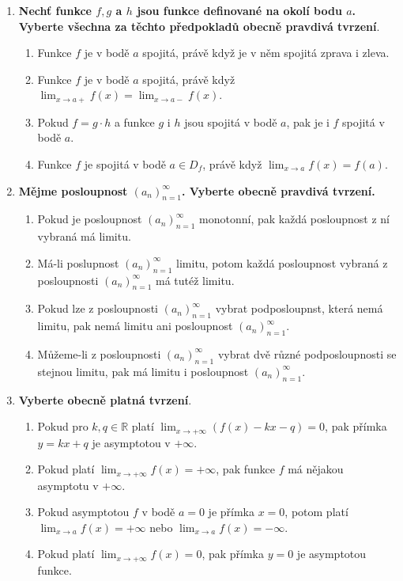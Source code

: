 \documentclass{article}
\begin{document}
\begin{enumerate}
    \pagebreak

    \item \textbf{Nechť funkce $f,g$ a $h$ jsou funkce definované na okolí bodu $a$. Vyberte všechna za těchto předpokladů obecně pravdivá tvrzení}. 
    \begin{enumerate}
        \item Funkce $f$ je v bodě $a$ spojitá, právě když je v něm spojitá zprava i zleva.
        \item Funkce $f$ je v bodě $a$ spojitá, právě když $\lim_{x \to a+}f(x) = \lim_{x \to a-}f(x)$.
        \item Pokud $f = g \cdot h$ a funkce $g$ i $h$ jsou spojitá v bodě $a$, pak je i $f$ spojitá v bodě $a$.
        \item Funkce $f$ je spojitá v bodě $a \in D_f$, právě když $\lim_{x \to a} f(x) = f(a)$.
    \end{enumerate}

    \item \textbf{Mějme posloupnost $(a_n)_{n=1}^\infty$. Vyberte obecně pravdivá tvrzení.}
    \begin{enumerate}
        \item Pokud je posloupnost $(a_n)_{n=1}^\infty$ monotonní, pak každá posloupnost z ní vybraná má limitu.
        \item Má-li poslupnost $(a_n)_{n=1}^\infty$ limitu, potom každá posloupnost vybraná z posloupnosti $(a_n)_{n=1}^\infty$ má tutéž limitu.
        \item Pokud lze z posloupnosti $(a_n)_{n=1}^\infty$ vybrat podposloupnst, která nemá limitu, pak nemá limitu ani posloupnost $(a_n)_{n=1}^\infty$.
        \item Můžeme-li z posloupnosti $(a_n)_{n=1}^\infty$ vybrat dvě různé podposloupnosti se stejnou limitu, pak má limitu i posloupnost $(a_n)_{n=1}^\infty$.
    \end{enumerate}

    
    \item \textbf{Vyberte obecně platná tvrzení}.
    \begin{enumerate}
        \item Pokud pro $k,q \in \mathbb{R}$ platí $\lim_{x \to +\infty}(f(x)-kx-q) = 0$, pak přímka $y = kx + q$ je asymptotou v $+\infty$.
        \item Pokud platí $\lim_{x \to +\infty}f(x) = + \infty$, pak funkce $f$ má nějakou asymptotu v $+\infty$.
        \item Pokud asymptotou $f$ v bodě $a=0$ je přímka $x=0$, potom platí $\lim_{x \to a}f(x) = +\infty$ nebo $\lim_{x \to a}f(x) = -\infty$.
        \item Pokud platí $\lim_{x \to +\infty}f(x) = 0$, pak přímka $y=0$ je asymptotou funkce.
    \end{enumerate}


\end{enumerate}
\end{document}

